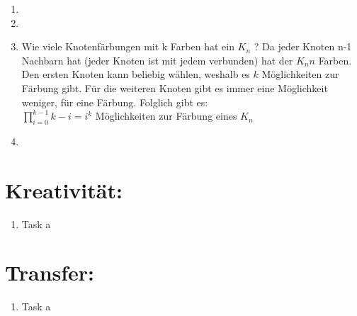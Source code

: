 \begin{enumerate}[label=(\alph*)]
        \item
        
        \item
        \item Wie viele Knotenfärbungen mit k Farben hat ein $K_n$ ?
        Da jeder Knoten n-1 Nachbarn hat (jeder Knoten ist mit jedem verbunden) hat der $K_n n$ Farben. Den ersten Knoten kann beliebig wählen, weshalb es $k$ Möglichkeiten zur Färbung gibt. Für die weiteren Knoten gibt es immer eine Möglichkeit weniger, für eine Färbung. Folglich gibt es: \\
        $\prod_{i=0}^{k-1} k - i = i^k $ Möglichkeiten zur Färbung eines $K_n$
          
        \item
        
    \end{enumerate}
    \section*{Kreativität:}
    \begin{enumerate}[label=(\alph*)]
    	\item Task a
    \end{enumerate}
    \section*{Transfer:}
    \begin{enumerate}[label=(\alph*)]
    	\item Task a
    \end{enumerate}







